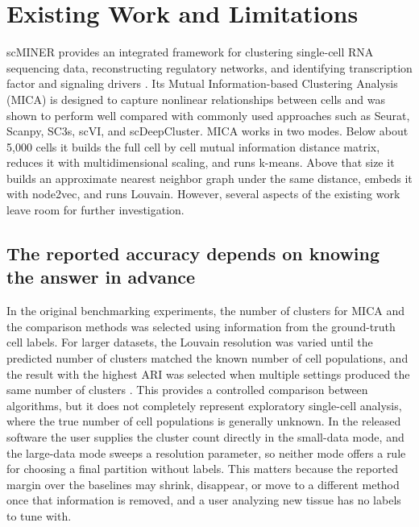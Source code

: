 \section{Existing Work and Limitations}
scMINER provides an integrated framework for clustering single-cell RNA sequencing data, reconstructing regulatory networks, and identifying transcription factor and signaling drivers \cite{pan2025scminer}. Its Mutual Information-based Clustering Analysis (MICA) is designed to capture nonlinear relationships between cells and was shown to perform well compared with commonly used approaches such as Seurat, Scanpy, SC3s, scVI, and scDeepCluster. MICA works in two modes. Below about 5,000 cells it builds the full cell by cell mutual information distance matrix, reduces it with multidimensional scaling, and runs k-means. Above that size it builds an approximate nearest neighbor graph under the same distance, embeds it with node2vec, and runs Louvain. However, several aspects of the existing work leave room for further investigation.

\subsection{The reported accuracy depends on knowing the answer in advance}
In the original benchmarking experiments, the number of clusters for MICA and the comparison methods was selected using information from the ground-truth cell labels. For larger datasets, the Louvain resolution was varied until the predicted number of clusters matched the known number of cell populations, and the result with the highest ARI was selected when multiple settings produced the same number of clusters \cite{pan2025scminer}. This provides a controlled comparison between algorithms, but it does not completely represent exploratory single-cell analysis, where the true number of cell populations is generally unknown. In the released software the user supplies the cluster count directly in the small-data mode, and the large-data mode sweeps a resolution parameter, so neither mode offers a rule for choosing a final partition without labels. This matters because the reported margin over the baselines may shrink, disappear, or move to a different method once that information is removed, and a user analyzing new tissue has no labels to tune with.

